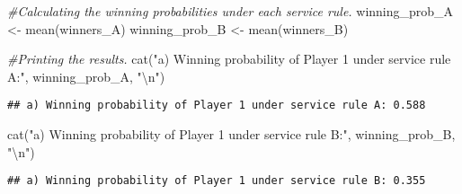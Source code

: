 \documentclass[
]{article}
\newenvironment{Shaded}{\begin{snugshade}}{\end{snugshade}}
\newcommand{\CommentTok}[1]{\textcolor[rgb]{0.56,0.35,0.01}{\textit{#1}}}
\newcommand{\FunctionTok}[1]{\textcolor[rgb]{0.00,0.00,0.00}{#1}}
\newcommand{\NormalTok}[1]{#1}
\newcommand{\OtherTok}[1]{\textcolor[rgb]{0.56,0.35,0.01}{#1}}
\newcommand{\SpecialCharTok}[1]{\textcolor[rgb]{0.00,0.00,0.00}{#1}}
\newcommand{\StringTok}[1]{\textcolor[rgb]{0.31,0.60,0.02}{#1}}
\begin{document}
\begin{Shaded}
\begin{Highlighting}[]
\CommentTok{\#Calculating the winning probabilities under each service rule.}
\NormalTok{winning\_prob\_A }\OtherTok{\textless{}{-}} \FunctionTok{mean}\NormalTok{(winners\_A)}
\NormalTok{winning\_prob\_B }\OtherTok{\textless{}{-}} \FunctionTok{mean}\NormalTok{(winners\_B)}

\CommentTok{\#Printing the results.}
\FunctionTok{cat}\NormalTok{(}\StringTok{"a) Winning probability of Player 1 under service rule A:"}\NormalTok{, winning\_prob\_A, }\StringTok{"}\SpecialCharTok{\textbackslash{}n}\StringTok{"}\NormalTok{)}
\end{Highlighting}
\end{Shaded}

\begin{verbatim}
## a) Winning probability of Player 1 under service rule A: 0.588
\end{verbatim}

\begin{Shaded}
\begin{Highlighting}[]
\FunctionTok{cat}\NormalTok{(}\StringTok{"a) Winning probability of Player 1 under service rule B:"}\NormalTok{, winning\_prob\_B, }\StringTok{"}\SpecialCharTok{\textbackslash{}n}\StringTok{"}\NormalTok{)}
\end{Highlighting}
\end{Shaded}

\begin{verbatim}
## a) Winning probability of Player 1 under service rule B: 0.355
\end{verbatim}
\end{document}
